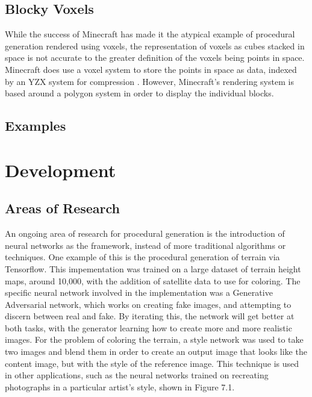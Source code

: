\documentclass[10pt]{report}
\begin{document}
		\section{Blocky Voxels}
		While the success of Minecraft has made it the atypical example of procedural generation rendered using voxels, the representation of voxels as cubes stacked in space is not accurate to the greater definition of the voxels being points in space. Minecraft does use a voxel system to store the points in space as data, indexed by an YZX system for compression \cite{minecraft-voxel}. However, Minecraft's rendering system is based around a polygon system in order to display the individual blocks. 
		
		\section{Examples}
		
	
	\vspace{10pt}
	\let\clearpage\relax
	\chapter{Development}

		\section{Areas of Research}
	
		An ongoing area of research for procedural generation is the introduction of neural networks as the framework, instead of more traditional algorithms or techniques. One example of this is the procedural generation of terrain via Tensorflow. This impementation was trained on a large dataset of terrain height maps, around 10,000, with the addition of satellite data to use for coloring. The specific neural network involved in the implementation was a Generative Adversarial network, which works on creating fake images, and attempting to discern between real and fake. By iterating this, the network will get better at both tasks, with the generator learning how to create more and more realistic images. For the problem of coloring the terrain, a style network was used to take two images and blend them in order to create an output image that looks like the content image, but with the style of the reference image. This technique is used in other applications, such as the neural networks trained on recreating photographs in a particular artist's style, shown in Figure 7.1. 
		
\end{document}

